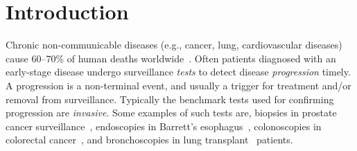\documentclass[useAMS, usenatbib, referee]{biom}
\begin{document}
\maketitle


%

\section{Introduction}
\label{sec:introduction}
Chronic non-communicable diseases (e.g., cancer, lung, cardiovascular diseases) cause 60--70\% of human deaths worldwide~\citep{world2014global}. Often patients diagnosed with an early-stage disease undergo surveillance \emph{tests} to detect disease \emph{progression} timely. A progression is a non-terminal event, and usually a trigger for treatment and/or removal from surveillance. Typically the benchmark tests used for confirming progression are \emph{invasive}. Some examples of such tests are, biopsies in prostate cancer surveillance~\citep{bokhorst2015compliance}, endoscopies in Barrett's esophagus~\citep{weusten2017endoscopic}, colonoscopies in colorectal cancer~\citep{krist2007timing}, and bronchoscopies in lung transplant~\citep{mcwilliams2008surveillance} patients.
\end{document}
